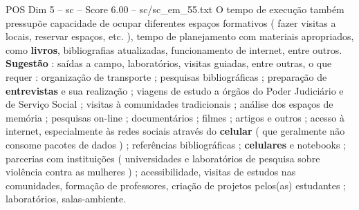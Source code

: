 \begin{textsample}{POS Dim 5 – sc – Score 6.00 – sc/sc\_em\_55.txt}
O tempo de execução também pressupõe capacidade de ocupar diferentes espaços formativos ( fazer visitas a locais, reservar espaços, etc. ), tempo de planejamento com materiais apropriados, como \textbf{livros}, bibliografias atualizadas, funcionamento de internet, entre outros. \textbf{Sugestão} : saídas a campo, laboratórios, visitas guiadas, entre outras, o que requer : organização de transporte ; pesquisas bibliográficas ; preparação de \textbf{entrevistas} e sua realização ; viagens de estudo a órgãos do Poder Judiciário e de Serviço Social ; visitas à comunidades tradicionais ; análise dos espaços de memória ; pesquisas on-line ; documentários ; filmes ; artigos e outros ; acesso à internet, especialmente às redes sociais através do \textbf{celular} ( que geralmente não consome pacotes de dados ) ; referências bibliográficas ; \textbf{celulares} e notebooks ; parcerias com instituições ( universidades e laboratórios de pesquisa sobre violência contra as mulheres ) ; acessibilidade, visitas de estudos nas comunidades, formação de professores, criação de projetos pelos(as) estudantes ; laboratórios, salas-ambiente.

\end{textsample}

